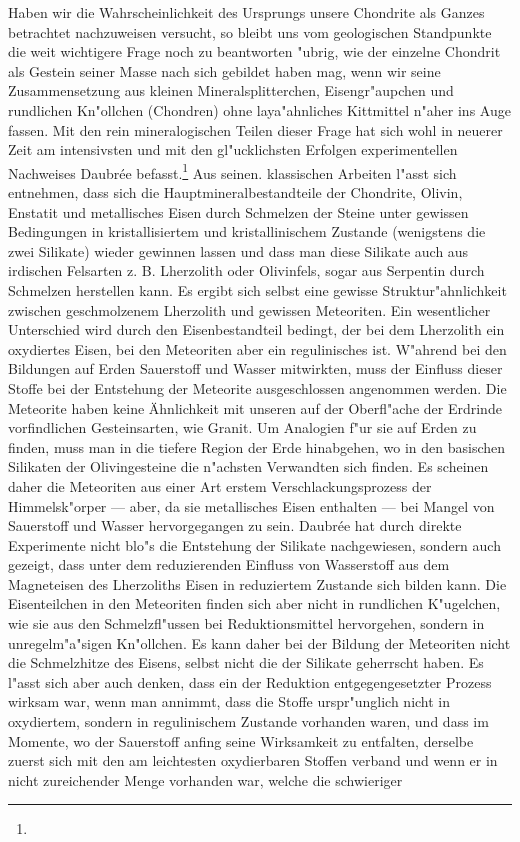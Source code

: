 \documentclass[a4paper, 11pt, oneside]{article}
\begin{document}
Haben wir die Wahrscheinlichkeit des Ursprungs unsere Chondrite als Ganzes betrachtet nachzuweisen versucht, so bleibt uns vom geologischen Standpunkte die weit wichtigere Frage noch zu beantworten "ubrig, wie der einzelne Chondrit als Gestein seiner Masse nach sich gebildet haben mag, wenn wir seine Zusammensetzung aus kleinen Mineralsplitterchen, Eisengr"aupchen und rundlichen Kn"ollchen (Chondren) ohne laya"ahnliches Kittmittel n"aher ins Auge fassen. Mit den rein mineralogischen Teilen dieser Frage hat sich wohl in neuerer Zeit am intensivsten und mit den gl"ucklichsten Erfolgen experimentellen Nachweises Daubrée befasst.\footnote{} Aus seinen. klassischen Arbeiten l"asst sich entnehmen, dass sich die Hauptmineralbestandteile der Chondrite, Olivin, Enstatit und metallisches Eisen durch Schmelzen der Steine unter gewissen Bedingungen in kristallisiertem und kristallinischem Zustande (wenigstens die zwei Silikate) wieder gewinnen lassen und dass man diese Silikate auch aus irdischen Felsarten z. B. Lherzolith oder Olivinfels, sogar aus Serpentin durch Schmelzen herstellen kann. Es ergibt sich selbst eine gewisse Struktur"ahnlichkeit zwischen geschmolzenem Lherzolith und gewissen Meteoriten. Ein wesentlicher Unterschied wird durch den Eisenbestandteil bedingt, der bei dem Lherzolith ein oxydiertes Eisen, bei den Meteoriten aber ein regulinisches ist. W"ahrend bei den Bildungen auf Erden Sauerstoff und Wasser mitwirkten, muss der Einfluss dieser Stoffe bei der Entstehung der Meteorite ausgeschlossen angenommen werden. Die Meteorite haben keine Ähnlichkeit mit unseren auf der Oberfl"ache der Erdrinde vorfindlichen Gesteinsarten, wie Granit. Um Analogien f"ur sie auf Erden zu finden, muss man in die tiefere Region der Erde hinabgehen, wo in den basischen Silikaten der Olivingesteine die n"achsten Verwandten sich finden. Es scheinen daher die Meteoriten aus einer Art erstem Verschlackungsprozess der Himmelsk"orper --- aber, da sie metallisches Eisen enthalten --- bei Mangel von Sauerstoff und Wasser hervorgegangen zu sein. Daubrée hat durch direkte Experimente nicht blo"s die Entstehung der Silikate nachgewiesen, sondern auch gezeigt, dass unter dem reduzierenden Einfluss von Wasserstoff aus dem Magneteisen des Lherzoliths Eisen in reduziertem Zustande sich bilden kann. Die Eisenteilchen in den Meteoriten finden sich aber nicht in rundlichen K"ugelchen, wie sie aus den Schmelzfl"ussen bei Reduktionsmittel hervorgehen, sondern in unregelm"a"sigen Kn"ollchen. Es kann daher bei der Bildung der Meteoriten nicht die Schmelzhitze des Eisens, selbst nicht die der Silikate geherrscht haben. Es l"asst sich aber auch denken, dass ein der Reduktion entgegengesetzter Prozess wirksam war, wenn man annimmt, dass die Stoffe urspr"unglich nicht in oxydiertem, sondern in regulinischem Zustande vorhanden waren, und dass im Momente, wo der Sauerstoff anfing seine Wirksamkeit zu entfalten, derselbe zuerst sich mit den am leichtesten oxydierbaren Stoffen verband und wenn er in nicht zureichender Menge vorhanden war, welche die schwieriger 
\end{document}
